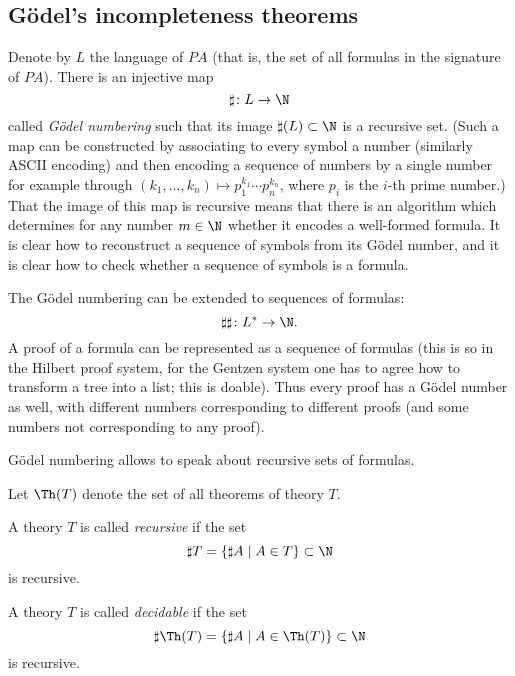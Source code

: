 \begin{page}
\setcounter{section}{3}
\setcounter{subsection}{5}
\setcounter{dfn}{31}
\label{portion:673}

\subsection{G\"odel's incompleteness theorems}
Denote by $L$ the language of $PA$ (that is, the set of all formulas in the signature of $PA$).
There is an injective map
\[
\sharp \colon L \to \N
\]
called \emph{G\"odel numbering} such that its image $\sharp(L) \subset \N$ is a recursive set.
(Such a map can be constructed by associating to every symbol a number (similarly ASCII encoding) and then encoding a sequence of numbers by a single number
for example through $(k_1, \ldots, k_n) \mapsto p_1^{k_1} \cdots p_n^{k_n}$, where $p_i$ is the $i$-th prime number.)
That the image of this map is recursive means that there is an algorithm which determines for any number $m \in \N$ whether it encodes a well-formed formula.
It is clear how to reconstruct a sequence of symbols from its G\"odel number, and it is clear how to check whether a sequence of symbols is a formula.

The G\"odel numbering can be extended to sequences of formulas:
\[
\sharp\sharp \colon L^* \to \N.
\]
A proof of a formula can be represented as a sequence of formulas
(this is so in the Hilbert proof system, for the Gentzen system one has to agree how to transform a tree into a list; this is doable).
Thus every proof has a G\"odel number as well, with different numbers corresponding to different proofs (and some numbers not corresponding to any proof).

G\"odel numbering allows to speak about recursive sets of formulas.

Let $\Th(T)$ denote the set of all theorems of theory $T$.


\end{page}

\begin{page}
\setcounter{section}{3}
\setcounter{subsection}{5}
\setcounter{dfn}{32}
\label{portion:675}

\begin{dfn}
A theory $T$ is called \emph{recursive} if the set
\[
\sharp T = \{\sharp A \mid A \in T\} \subset \N
\]
is recursive.

A theory $T$ is called \emph{decidable} if the set
\[
\sharp \Th(T) = \{\sharp A \mid A \in \Th(T)\} \subset \N
\]
is recursive.
\end{dfn}

\end{page}

